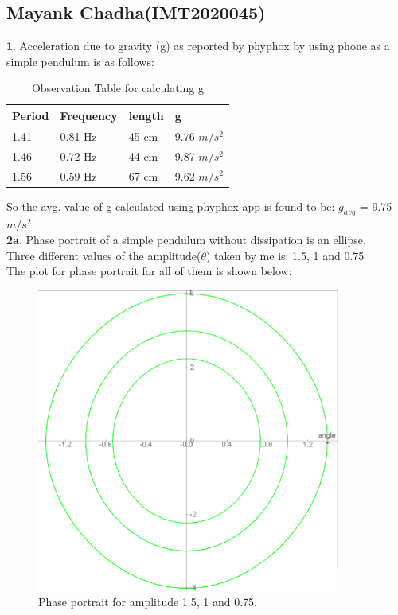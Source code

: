 \documentclass[11pt]{scrartcl} %
\begin{document}
\subsection{Mayank Chadha(IMT2020045)}
\textbf{1}.
Acceleration due to gravity (g) as reported by phyphox by using phone as a simple pendulum is as follows:\\

\begin{table}[h] %
	\centering %
	\begin{tabular}{l l l l}
		\toprule
		\textbf{Period} & \textbf{Frequency} & \textbf{length} & \textbf{g} \\
		\midrule
		1.41 & 0.81 Hz & 45 cm & 9.76 $m/s^2$\\
        1.46 & 0.72 Hz & 44 cm & 9.87 $m/s^2$\\
        1.56 & 0.59 Hz & 67 cm & 9.62 $m/s^2$\\
		\bottomrule
	\end{tabular}
	\caption{Observation Table for calculating g}
\end{table}

So the avg. value of g calculated using phyphox app is found to be: $g_{avg}$ = 9.75 $m/s^2$ \\
\textbf{2a}.
Phase portrait of a simple pendulum without dissipation is an ellipse.\\
Three different values of the amplitude($\theta$) taken by me is: 1.5, 1 and 0.75\\

The plot for phase portrait for all of them is shown below:

\begin{figure}[h] %
	\centering
	\includegraphics[width=\textwidth, height=10cm]{Figures/M 2a.png} %
	\caption{Phase portrait for amplitude 1.5, 1 and 0.75.}
\end{figure}
\end{document}
